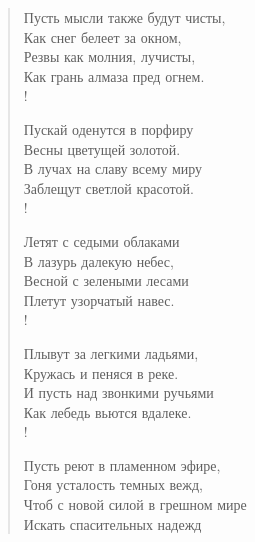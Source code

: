 \newpage
\vspace*{0cm}


\begin{verse}
\begin{altverse}
Пусть мысли также будут чисты,\\
          Как снег белеет за окном,\\
Резвы как молния, лучисты,\\
          Как грань алмаза пред огнем.\\!

Пускай оденутся в порфиру\\
          Весны цветущей золотой.\\
В лучах на славу всему миру\\
          Заблещут светлой красотой.\\!

Летят с седыми облаками\\
          В лазурь далекую небес,\\
Весной с зелеными лесами\\
          Плетут узорчатый навес.\\!

Плывут за легкими ладьями,\\
          Кружась и пеняся в реке.\\
И пусть над звонкими ручьями\\
          Как лебедь вьются вдалеке.\\!

Пусть реют в пламенном эфире,\\
          Гоня усталость темных вежд,\\
Чтоб с новой силой в грешном мире\\
Искать спасительных надежд\ldotst
\end{altverse}
\end{verse}
